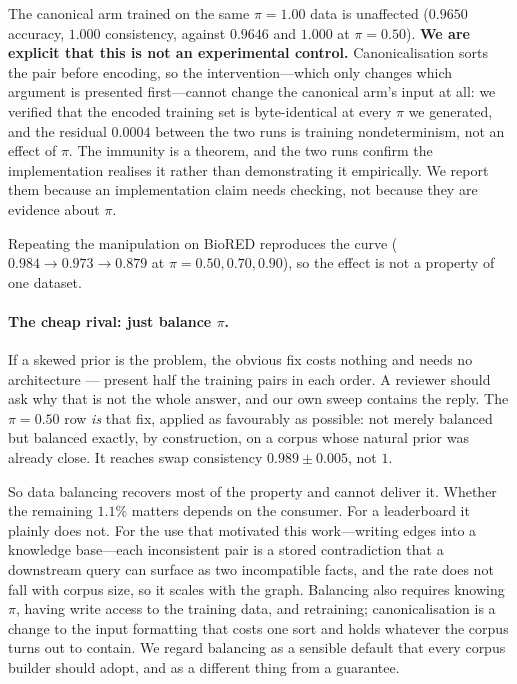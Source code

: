 \documentclass[11pt]{article}
\begin{document}
The canonical arm trained on the same $\pi = 1.00$ data is unaffected ($0.9650$ accuracy,
$1.000$ consistency, against $0.9646$ and $1.000$ at $\pi = 0.50$). \textbf{We are explicit that
this is not an experimental control.} Canonicalisation sorts the pair before encoding, so the
intervention---which only changes which argument is presented first---cannot change the canonical
arm's input at all: we verified that the encoded training set is byte-identical at every $\pi$ we
generated, and the residual $0.0004$ between the two runs is training nondeterminism, not an
effect of $\pi$. The immunity is a theorem, and the two runs confirm the implementation realises
it rather than demonstrating it empirically. We report them because an implementation claim needs
checking, not because they are evidence about $\pi$.

Repeating the manipulation on BioRED reproduces the curve ($0.984 \rightarrow 0.973 \rightarrow
0.879$ at $\pi = 0.50, 0.70, 0.90$), so the effect is not a property of one dataset.

\paragraph{The cheap rival: just balance $\pi$.}
If a skewed prior is the problem, the obvious fix costs nothing and needs no architecture ---
present half the training pairs in each order. A reviewer should ask why that is not the whole
answer, and our own sweep contains the reply. The $\pi = 0.50$ row \emph{is} that fix, applied as
favourably as possible: not merely balanced but balanced exactly, by construction, on a corpus
whose natural prior was already close. It reaches swap consistency $0.989 \pm 0.005$, not $1$.

So data balancing recovers most of the property and cannot deliver it. Whether the remaining
$1.1\%$ matters depends on the consumer. For a leaderboard it plainly does not. For the use that
motivated this work---writing edges into a knowledge base---each inconsistent pair is a stored
contradiction that a downstream query can surface as two incompatible facts, and the rate does not
fall with corpus size, so it scales with the graph. Balancing also requires knowing $\pi$, having
write access to the training data, and retraining; canonicalisation is a change to the input
formatting that costs one sort and holds whatever the corpus turns out to contain. We regard
balancing as a sensible default that every corpus builder should adopt, and as a different thing
from a guarantee.
\end{document}
